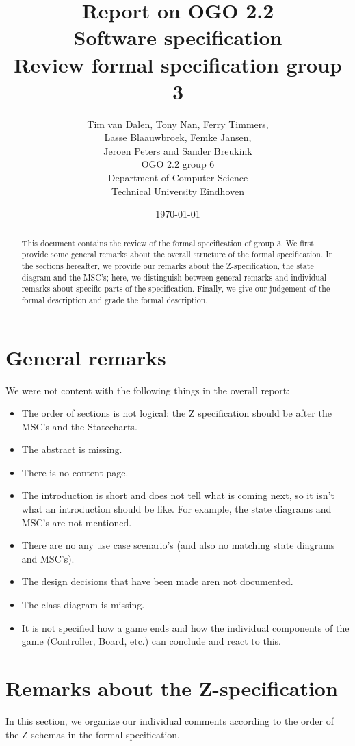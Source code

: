 \documentclass[a4paper,11pt]{article}
\title{Report on OGO 2.2 \\ Software specification\\ Review formal specification group 3}
\author{
        Tim van Dalen, Tony Nan, Ferry Timmers, \\ Lasse Blaauwbroek, Femke Jansen, \\Jeroen Peters and Sander Breukink\\ OGO 2.2 group 6 \\
                Department of Computer Science\\
        Technical University Eindhoven\\
}
\date{\today}
\begin{document}
\maketitle

\begin{abstract}
This document contains the review of the formal specification of group 3. We first provide some general remarks about the overall structure of the formal specification. In the sections hereafter, we provide our remarks about the Z-specification, the state diagram and the MSC's; here, we distinguish between general remarks and individual remarks about specific parts of the specification. Finally, we give our judgement of the formal description and grade the formal description.
\end{abstract}

\newpage
	
	\tableofcontents
	\newpage
	
	\section{General remarks}
    We were not content with the following things in the overall report:
    \begin{itemize}
        \item The order of sections is not logical: the Z specification should be after the MSC's and the Statecharts.
        \item The abstract is missing.
        \item There is no content page.
        \item The introduction is short and does not tell what is coming next, so it isn't what an introduction should be like. For example, the state diagrams and MSC's are not mentioned.
        \item There are no any use case scenario's (and also no matching state diagrams and MSC's).
        \item The design decisions that have been made aren not documented.
        \item The class diagram is missing.
        \item It is not specified how a game ends and how the individual components of the game (Controller, Board, etc.) can conclude and react to this.
    \end{itemize}
	
	\section{Remarks about the Z-specification}
    In this section, we organize our individual comments according to the order of the Z-schemas in the formal specification.
\end{document}
